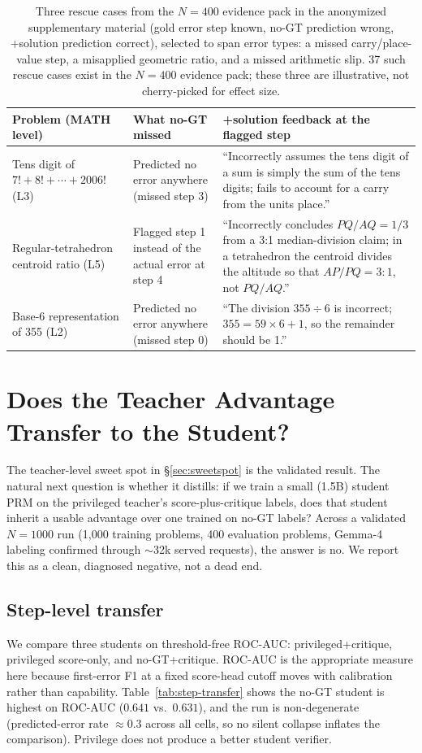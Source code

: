 \documentclass{article}
\begin{document}
\begin{table}[t]
\centering
\small
\begin{tabular}{p{2.4cm}p{4.6cm}p{5.4cm}}
\toprule
Problem (MATH level) & What no-GT missed & +solution feedback at the flagged step \\
\midrule
Tens digit of $7!+8!+\cdots+2006!$ (L3) & Predicted no error anywhere (missed step 3) & ``Incorrectly assumes the tens digit of a sum is simply the sum of the tens digits; fails to account for a carry from the units place.'' \\
Regular-tetrahedron centroid ratio (L5) & Flagged step 1 instead of the actual error at step 4 & ``Incorrectly concludes $PQ/AQ=1/3$ from a 3{:}1 median-division claim; in a tetrahedron the centroid divides the altitude so that $AP/PQ=3{:}1$, not $PQ/AQ$.'' \\
Base-6 representation of 355 (L2) & Predicted no error anywhere (missed step 0) & ``The division $355 \div 6$ is incorrect; $355 = 59 \times 6 + 1$, so the remainder should be 1.'' \\
\bottomrule
\end{tabular}
\caption{Three rescue cases from the $N{=}400$ evidence pack in the
anonymized supplementary material
(gold error step known, no-GT prediction wrong, +solution prediction correct),
selected to span error types: a missed carry/place-value step, a misapplied
geometric ratio, and a missed arithmetic slip. 37 such rescue cases exist in
the $N{=}400$ evidence pack; these three are illustrative, not
cherry-picked for effect size.}
\label{tab:flip-cases}
\end{table}

\section{Does the Teacher Advantage Transfer to the Student?}
\label{sec:transfer}

The teacher-level sweet spot in \S\ref{sec:sweetspot} is the validated
result. The natural next question is whether it distills: if we train a
small (1.5B) student PRM on the privileged teacher's score-plus-critique
labels, does that student inherit a usable advantage over one trained on
no-GT labels? Across a validated $N=1000$ run (1{,}000 training problems,
400 evaluation problems, Gemma-4 labeling confirmed through $\sim$32k served
requests), the answer is no. We report this as a clean, diagnosed negative,
not a dead end.

\subsection{Step-level transfer}
We compare three students on threshold-free ROC-AUC: privileged+critique,
privileged score-only, and no-GT+critique. ROC-AUC is the appropriate measure here
because first-error F1 at a fixed score-head cutoff moves with calibration
rather than capability. Table~\ref{tab:step-transfer} shows the no-GT
student is highest on ROC-AUC ($0.641$ vs.\ $0.631$), and the run is
non-degenerate (predicted-error rate $\approx 0.3$ across all cells, so no
silent collapse inflates the comparison). Privilege does not produce a
better student verifier.
\end{document}
